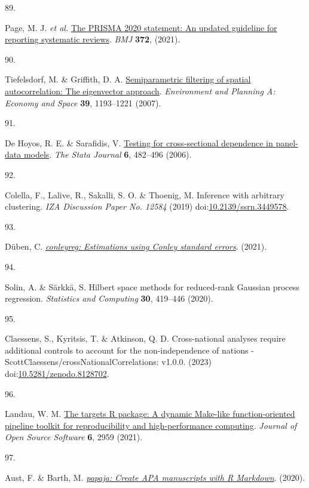 \documentclass[
  man,floatsintext]{apa6}
\newlength{\cslhangindent}
\newlength{\csllabelwidth}
\newlength{\cslentryspacingunit} %
\newenvironment{CSLReferences}[2] %
 {%
  \setlength{\parindent}{0pt}
  \ifodd #1
  \let\oldpar\par
  \def\par{\hangindent=\cslhangindent\oldpar}
  \fi
  \setlength{\parskip}{#2\cslentryspacingunit}
 }%
 {}
\newcommand{\CSLLeftMargin}[1]{\parbox[t]{\csllabelwidth}{#1}}
\newcommand{\CSLRightInline}[1]{\parbox[t]{\linewidth - \csllabelwidth}{#1}\break}
\begin{document}
\begin{CSLReferences}{0}{0}
\leavevmode{}%
\CSLLeftMargin{89. }%
\CSLRightInline{Page, M. J. \emph{et al.} \href{https://doi.org/10.1136/bmj.n71}{The {PRISMA} 2020 statement: An updated guideline for reporting systematic reviews}. \emph{BMJ} \textbf{372}, (2021).}

\leavevmode{}%
\CSLLeftMargin{90. }%
\CSLRightInline{Tiefelsdorf, M. \& Griffith, D. A. \href{https://doi.org/10.1068/a37378}{Semiparametric filtering of spatial autocorrelation: The eigenvector approach}. \emph{Environment and Planning A: Economy and Space} \textbf{39}, 1193--1221 (2007).}

\leavevmode{}%
\CSLLeftMargin{91. }%
\CSLRightInline{De Hoyos, R. E. \& Sarafidis, V. \href{https://doi.org/10.1177/1536867X0600600403}{Testing for cross-sectional dependence in panel-data models}. \emph{The Stata Journal} \textbf{6}, 482--496 (2006).}

\leavevmode{}%
\CSLLeftMargin{92. }%
\CSLRightInline{Colella, F., Lalive, R., Sakalli, S. O. \& Thoenig, M. Inference with arbitrary clustering. \emph{IZA Discussion Paper No. 12584} (2019) doi:\href{https://doi.org/10.2139/ssrn.3449578}{10.2139/ssrn.3449578}.}

\leavevmode{}%
\CSLLeftMargin{93. }%
\CSLRightInline{Düben, C. \emph{\href{https://CRAN.R-project.org/package=conleyreg}{{conleyreg}: Estimations using {C}onley standard errors}}. (2021).}

\leavevmode{}%
\CSLLeftMargin{94. }%
\CSLRightInline{Solin, A. \& Särkkä, S. Hilbert space methods for reduced-rank {G}aussian process regression. \emph{Statistics and Computing} \textbf{30}, 419--446 (2020).}

\leavevmode{}%
\CSLLeftMargin{95. }%
\CSLRightInline{Claessens, S., Kyritsis, T. \& Atkinson, Q. D. Cross-national analyses require additional controls to account for the non-independence of nations - ScottClaessens/crossNationalCorrelations: v1.0.0. (2023) doi:\href{https://doi.org/10.5281/zenodo.8128702}{10.5281/zenodo.8128702}.}

\leavevmode{}%
\CSLLeftMargin{96. }%
\CSLRightInline{Landau, W. M. \href{https://doi.org/10.21105/joss.02959}{The targets {R} package: A dynamic {M}ake-like function-oriented pipeline toolkit for reproducibility and high-performance computing}. \emph{Journal of Open Source Software} \textbf{6}, 2959 (2021).}

\leavevmode{}%
\CSLLeftMargin{97. }%
\CSLRightInline{Aust, F. \& Barth, M. \emph{\href{https://github.com/crsh/papaja}{{papaja}: {Create} {APA} manuscripts with {R Markdown}}}. (2020).}

\end{CSLReferences}
\end{document}
